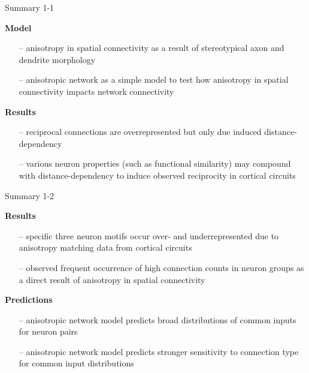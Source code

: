 \begin{frame}{Summary 1-1}

  \large\textbf{Model}
  
  \begin{itemize}[leftmargin=0.6cm]
    \large
    \itemsep6pt
  \item[--] anisotropy in spatial connectivity as a result of
    stereotypical axon and dendrite morphology
  \item[--] anisotropic network as a simple model to test how
    anisotropy in spatial connectivity impacts network connectivity
  \end{itemize}

  \vfill

  \large\textbf{Results}
  
  \begin{itemize}[leftmargin=0.6cm]
    \large
    \itemsep6pt
  \item[--] reciprocal connections are overrepresented but only
    due induced distance-dependency
  \item[--] various neuron properties (such as functional
    similarity) may compound with distance\--dependency to induce
    observed reciprocity in cortical circuits
    
  \end{itemize}


\end{frame}

\begin{frame}{Summary 1-2}

  \large\textbf{Results}
  
  \begin{itemize}[leftmargin=0.6cm]
    \large
    \itemsep6pt
  \item[--] specific three neuron motifs occur over- and
    underrepresented due to anisotropy matching data from
    cortical circuits
  \item[--] observed frequent occurrence of high connection counts in
    neuron groups as a direct result of anisotropy in spatial
    connectivity
    
  \end{itemize}

  \vfill
  
  \large\textbf{Predictions}
  
  \begin{itemize}[leftmargin=0.6cm]
    \large
    \itemsep6pt
  \item[--] anisotropic network model predicts broad distributions of common
    inputs for neuron pairs
  \item[--] anisotropic network model predicts stronger sensitivity to
    connection type for common input distributions
  \end{itemize}  
  
\end{frame}
